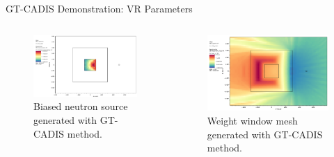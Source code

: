 \documentclass{beamer}
\begin{document}
\begin{frame}{GT-CADIS Demonstration: VR Parameters}
	\begin{columns}
\begin{figure} 
	\includegraphics[scale=0.17]{biased_n_src.png}
	\caption [GT-CADIS biased neutron source] 
	{Biased neutron source generated with GT-CADIS method.\label{fig:ex.biased_src}}
\end{figure}


\begin{figure} 
	\includegraphics[scale=0.15]{gtcadis_wwn.png}
	\caption [GT-CADIS weight window mesh]
	{Weight window mesh generated with GT-CADIS method.\label{fig:ex.wwinp}}
\end{figure}

	\end{columns}
\end{frame}
\end{document}
